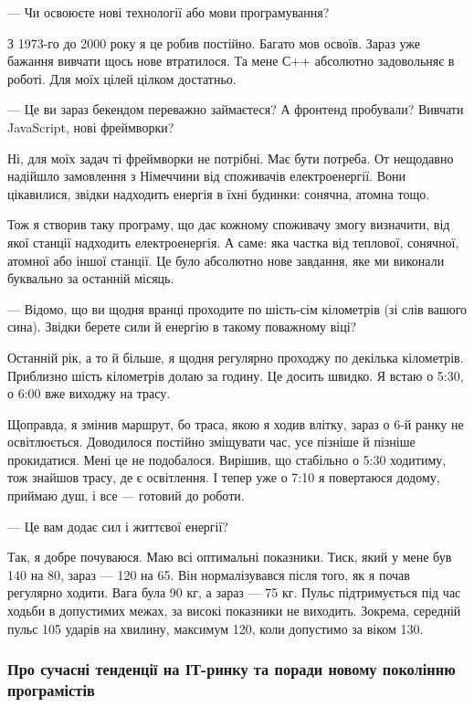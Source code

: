 — Чи освоюєте нові технології або мови програмування?

З 1973-го до 2000 року я це робив постійно. Багато мов освоїв. Зараз уже
бажання вивчати щось нове втратилося. Та мене С++ абсолютно задовольняє в
роботі. Для моїх цілей цілком достатньо.

— Це ви зараз бекендом переважно займаєтеся? А фронтенд пробували? Вивчати
JavaScript, нові фреймворки?

Ні, для моїх задач ті фреймворки не потрібні. Має бути потреба. От нещодавно
надійшло замовлення з Німеччини від споживачів електроенергії. Вони цікавилися,
звідки надходить енергія в їхні будинки: сонячна, атомна тощо.

Тож я створив таку програму, що дає кожному споживачу змогу визначити, від якої
станції надходить електроенергія. А саме: яка частка від теплової, сонячної,
атомної або іншої станції. Це було абсолютно нове завдання, яке ми виконали
буквально за останній місяць.

— Відомо, що ви щодня вранці проходите по шість-сім кілометрів (зі слів вашого
сина). Звідки берете сили й енергію в такому поважному віці?

Останній рік, а то й більше, я щодня регулярно проходжу по декілька кілометрів.
Приблизно шість кілометрів долаю за годину. Це досить швидко. Я встаю о 5:30, о
6:00 вже виходжу на трасу.

Щоправда, я змінив маршрут, бо траса, якою я ходив влітку, зараз о 6-й ранку не
освітлюється. Доводилося постійно зміщувати час, усе пізніше й пізніше
прокидатися. Мені це не подобалося. Вирішив, що стабільно о 5:30 ходитиму, тож
знайшов трасу, де є освітлення. І тепер уже о 7:10 я повертаюся додому, приймаю
душ, і все — готовий до роботи.

— Це вам додає сил і життєвої енергії?

Так, я добре почуваюся. Маю всі оптимальні показники. Тиск, який у мене був 140
на 80, зараз — 120 на 65. Він нормалізувався після того, як я почав регулярно
ходити. Вага була 90 кг, а зараз — 75 кг. Пульс підтримується під час ходьби в
допустимих межах, за високі показники не виходить. Зокрема, середній пульс 105
ударів на хвилину, максимум 120, коли допустимо за віком 130.

\subsubsection{Про сучасні тенденції на ІТ-ринку та поради новому поколінню програмістів}

